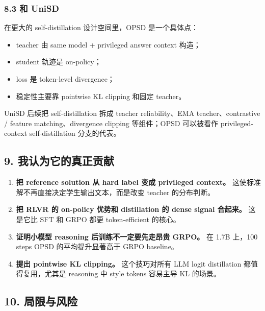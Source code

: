 \subsubsection{8.3 和 UniSD}

在更大的 self-distillation 设计空间里，OPSD 是一个具体点：

\begin{itemize}[leftmargin=1.5em]
  \item teacher 由 same model + privileged answer context 构造；
  \item student 轨迹是 on-policy；
  \item loss 是 token-level divergence；
  \item 稳定性主要靠 pointwise KL clipping 和固定 teacher。
\end{itemize}

UniSD 后续把 self-distillation 拆成 teacher reliability、EMA teacher、contrastive / feature matching、divergence clipping 等组件；OPSD 可以被看作 privileged-context self-distillation 分支的代表。

\subsection{9. 我认为它的真正贡献}

\begin{enumerate}[leftmargin=1.5em]
  \item \textbf{把 reference solution 从 hard label 变成 privileged context。} 这使标准解不再直接决定学生输出文本，而是改变 teacher 的分布判断。
  \item \textbf{把 RLVR 的 on-policy 优势和 distillation 的 dense signal 合起来。} 这是它比 SFT 和 GRPO 都更 token-efficient 的核心。
  \item \textbf{证明小模型 reasoning 后训练不一定要先走昂贵 GRPO。} 在 1.7B 上，100 steps OPSD 的平均提升显著高于 GRPO baseline。
  \item \textbf{提出 pointwise KL clipping。} 这个技巧对所有 LLM logit distillation 都值得复用，尤其是 reasoning 中 style tokens 容易主导 KL 的场景。
\end{enumerate}

\subsection{10. 局限与风险}

